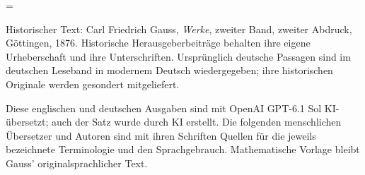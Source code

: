 \clearpage
\newcount\SavedTranslationPage
\SavedTranslationPage=\value{page}
\hypersetup{pageanchor=false}
\begingroup
\pagestyle{empty}\thispagestyle{empty}
\medskip
\small\raggedright
Historischer Text: Carl Friedrich Gauss, \emph{Werke}, zweiter Band, zweiter Abdruck, Göttingen, 1876. Historische Herausgeberbeiträge behalten ihre eigene Urheberschaft und ihre Unterschriften. Ursprünglich deutsche Passagen sind im deutschen Leseband in modernem Deutsch wiedergegeben; ihre historischen Originale werden gesondert mitgeliefert.

Diese englischen und deutschen Ausgaben sind mit OpenAI GPT-6.1 Sol KI-übersetzt; auch der Satz wurde durch KI erstellt. Die folgenden menschlichen Übersetzer und Autoren sind mit ihren Schriften Quellen für die jeweils bezeichnete Terminologie und den Sprachgebrauch. Mathematische Vorlage bleibt Gauss' originalsprachlicher Text.

